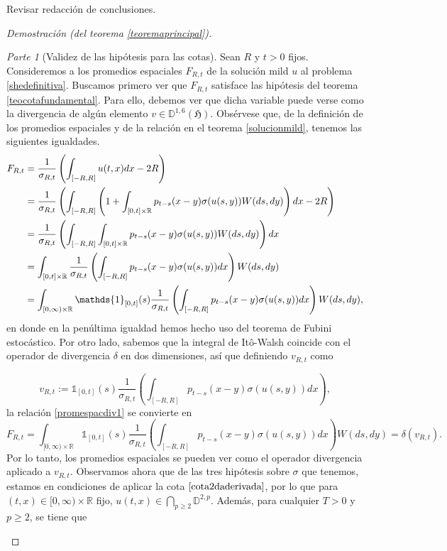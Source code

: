 \documentclass[letterpaper,twoside,12pt]{book}
\newcommand{\R}{\mathbb{R}}
\newcommand{\D}{\mathbb{D}}
\newcommand{\1}{\mathds{1}}
\theoremstyle{definition}
\theoremstyle{definition}
\theoremstyle{remark}
\newtheorem{proofpart}{Parte}
\theoremstyle{definition}
\theoremstyle{definition}
\theoremstyle{definition}
\theoremstyle{definition}
\theoremstyle{definition}
\begin{document}
 {\color{red}  Revisar redacción de conclusiones.}
\begin{proof}[Demostración (del teorema \ref{teoremaprincipal})]

\begin{proofpart}[Validez de las hipótesis para las cotas]
Sean $R$ y $t>0$ fijos. Consideremos a los promedios espaciales $F_{R,t}$ de la solución mild $u$ al problema \eqref{shedefinitiva}. Buscamos primero ver que $F_{R,t}$ satisface las hipótesis del teorema \ref{teocotafundamental}. Para ello, debemos ver que dicha variable puede verse como la divergencia de algún elemento $v\in \D^{1,6}(\mathfrak{H})$. Obsérvese que, de la definición de los promedios espaciales y de la relación en el teorema \ref{solucionmild}, tenemos las siguientes igualdades.
\begin{align}
   F_{R,t}&=\frac{1}{\sigma_{R,t}}\left(\int_{[-R,R]}u(t,x)dx-2R\right)\notag\\
   &=\frac{1}{\sigma_{R,t}}\left(\int_{[-R,R]}\left(1+\int_{[0,t]\times \R}p_{t-s}(x-y)\sigma(u(s,y))W(ds,dy)\right)dx-2R\right)\notag\\
   &=\frac{1}{\sigma_{R,t}}\left(\int_{[-R,R]}\int_{[0,t]\times \R}p_{t-s}(x-y)\sigma(u(s,y))W(ds,dy)\right)dx\notag\\
   &=\int_{[0,t]\times \R}\frac{1}{\sigma_{R,t}}\left(\int_{[-R,R]}p_{t-s}(x-y)\sigma(u(s,y))dx\right)W(ds,dy)\notag\\
   &=\int_{[0,\infty)\times \R}\1_{[0,t]}(s)\frac{1}{\sigma_{R,t}}\left(\int_{[-R,R]}p_{t-s}(x-y)\sigma(u(s,y))dx\right)W(ds,dy)\label{promespacdiv1},
\end{align}
en donde en la penúltima igualdad hemos hecho uso del teorema de Fubini estocástico. Por otro lado, sabemos que la integral de Itô-Walsh coincide con el operador de divergencia $\delta$ en dos dimensiones, así que definiendo $v_{R,t}$ como 

\begin{equation}\label{vectordireccion}
      v_{R,t}:=\1_{[0,t]}(s)\frac{1}{\sigma_{R,t}}\left(\int_{[-R,R]}p_{t-s}(x-y)\sigma(u(s,y))dx\right),
\end{equation}
 la relación \eqref{promespacdiv1} se convierte en
\begin{equation}\label{promespacialdiv2}
F_{R,t}=\int_{[0,\infty)\times \R}\1_{[0,t]}(s)\frac{1}{\sigma_{R,t}}\left(\int_{[-R,R]}p_{t-s}(x-y)\sigma(u(s,y))dx\right)W(ds,dy)=\delta(v_{R,t}).
\end{equation}
Por lo tanto, los promedios espaciales se pueden ver como el operador divergencia aplicado a $v_{R,t}$. Observamos ahora que de las tres hipótesis sobre $\sigma$ que tenemos, estamos en condiciones de aplicar la cota $\eqref{cota2daderivada}$, por lo que para $(t,x)\in [0,\infty)\times\R$ fijo, $u(t,x)\in \bigcap_{p\geq2} \D^{2,p}$. Además, para cualquier $T>0$ y $p\geq2$, se tiene que 


\end{proofpart}
\end{proof}
\end{document}
